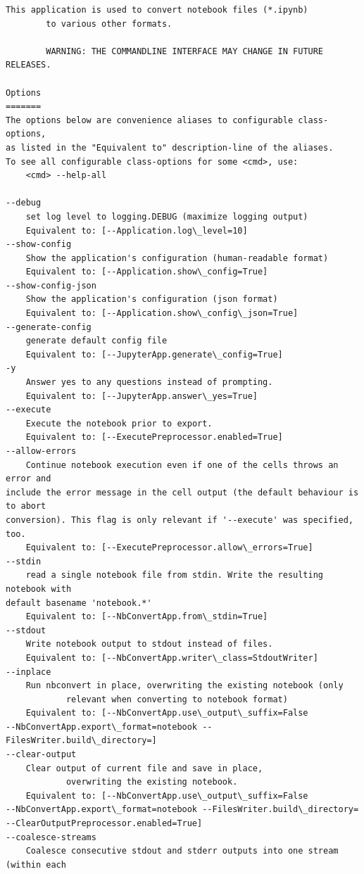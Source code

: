 \documentclass[11pt]{article}
\begin{document}
    \begin{Verbatim}[commandchars=\\\{\}]
This application is used to convert notebook files (*.ipynb)
        to various other formats.

        WARNING: THE COMMANDLINE INTERFACE MAY CHANGE IN FUTURE RELEASES.

Options
=======
The options below are convenience aliases to configurable class-options,
as listed in the "Equivalent to" description-line of the aliases.
To see all configurable class-options for some <cmd>, use:
    <cmd> --help-all

--debug
    set log level to logging.DEBUG (maximize logging output)
    Equivalent to: [--Application.log\_level=10]
--show-config
    Show the application's configuration (human-readable format)
    Equivalent to: [--Application.show\_config=True]
--show-config-json
    Show the application's configuration (json format)
    Equivalent to: [--Application.show\_config\_json=True]
--generate-config
    generate default config file
    Equivalent to: [--JupyterApp.generate\_config=True]
-y
    Answer yes to any questions instead of prompting.
    Equivalent to: [--JupyterApp.answer\_yes=True]
--execute
    Execute the notebook prior to export.
    Equivalent to: [--ExecutePreprocessor.enabled=True]
--allow-errors
    Continue notebook execution even if one of the cells throws an error and
include the error message in the cell output (the default behaviour is to abort
conversion). This flag is only relevant if '--execute' was specified, too.
    Equivalent to: [--ExecutePreprocessor.allow\_errors=True]
--stdin
    read a single notebook file from stdin. Write the resulting notebook with
default basename 'notebook.*'
    Equivalent to: [--NbConvertApp.from\_stdin=True]
--stdout
    Write notebook output to stdout instead of files.
    Equivalent to: [--NbConvertApp.writer\_class=StdoutWriter]
--inplace
    Run nbconvert in place, overwriting the existing notebook (only
            relevant when converting to notebook format)
    Equivalent to: [--NbConvertApp.use\_output\_suffix=False
--NbConvertApp.export\_format=notebook --FilesWriter.build\_directory=]
--clear-output
    Clear output of current file and save in place,
            overwriting the existing notebook.
    Equivalent to: [--NbConvertApp.use\_output\_suffix=False
--NbConvertApp.export\_format=notebook --FilesWriter.build\_directory=
--ClearOutputPreprocessor.enabled=True]
--coalesce-streams
    Coalesce consecutive stdout and stderr outputs into one stream (within each

\end{Verbatim}
\end{document}

